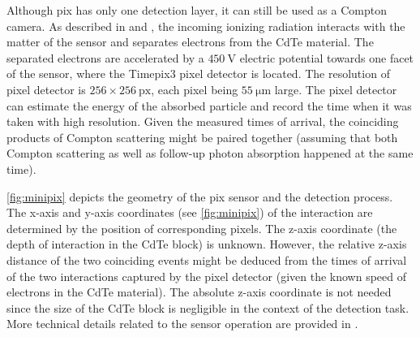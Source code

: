 Although \ac{pix} has only one detection layer, it can still be used as a Compton camera.
As described in \cite{baca2021gamma} and \cite{baca2019timepix}, the incoming ionizing radiation interacts with the matter of the sensor and separates electrons from the \ac{CdTe} material.
The separated electrons are accelerated by a $\SI{450}{\volt}$ electric potential towards one facet of the sensor, where the Timepix3 pixel detector is located.
The resolution of pixel detector is $256 \times 256\ \mathrm{px}$, each pixel being $55\ \si{\micro\meter}$ large.
The pixel detector can estimate the energy of the absorbed particle and record the time when it was taken with high resolution.
Given the measured times of arrival, the coinciding products of Compton scattering might be paired together (assuming that both Compton scattering as well as follow-up photon absorption happened at the same time).

\autoref{fig:minipix} depicts the geometry of the \ac{pix} sensor and the detection process.
The x-axis and y-axis coordinates (see \autoref{fig:minipix}) of the interaction are determined by the position of corresponding pixels.
The z-axis coordinate (the depth of interaction in the \ac{CdTe} block) is unknown.
However, the relative z-axis distance of the two coinciding events might be deduced from the times of arrival of the two interactions captured by the pixel detector (given the known speed of electrons in the \ac{CdTe} material).
The absolute z-axis coordinate is not needed since the size of the \ac{CdTe} block is negligible in the context of the detection task.
More technical details related to the sensor operation are provided in \cite{baca2019timepix}.

